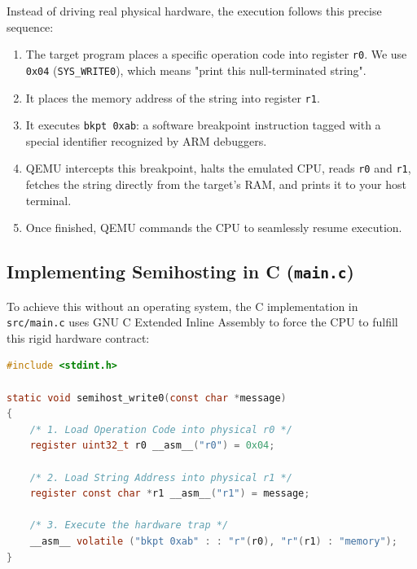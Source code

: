 Instead of driving real physical hardware, the execution follows this precise sequence:
\begin{enumerate}
    \item The target program places a specific operation code into register \texttt{r0}. We use \texttt{0x04} (\texttt{SYS\_WRITE0}), which means "print this null-terminated string".
    \item It places the memory address of the string into register \texttt{r1}.
    \item It executes \texttt{bkpt 0xab}: a software breakpoint instruction tagged with a special identifier recognized by ARM debuggers.
    \item QEMU intercepts this breakpoint, halts the emulated CPU, reads \texttt{r0} and \texttt{r1}, fetches the string directly from the target's RAM, and prints it to your host terminal.
    \item Once finished, QEMU commands the CPU to seamlessly resume execution.
\end{enumerate}

\subsection{Implementing Semihosting in C (\texttt{main.c})}
To achieve this without an operating system, the C implementation in \texttt{src/main.c} uses GNU C Extended Inline Assembly to force the CPU to fulfill this rigid hardware contract:

\begin{lstlisting}[language=c]
#include <stdint.h>

static void semihost_write0(const char *message)
{
    /* 1. Load Operation Code into physical r0 */
    register uint32_t r0 __asm__("r0") = 0x04;
    
    /* 2. Load String Address into physical r1 */
    register const char *r1 __asm__("r1") = message;
    
    /* 3. Execute the hardware trap */
    __asm__ volatile ("bkpt 0xab" : : "r"(r0), "r"(r1) : "memory");
}
\end{lstlisting}


